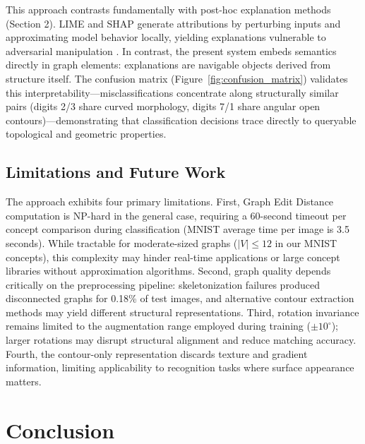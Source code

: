 \documentclass[runningheads]{llncs}
\begin{document}
This approach contrasts fundamentally with post-hoc explanation methods (Section 2). LIME and SHAP generate attributions by perturbing inputs and approximating model behavior locally, yielding explanations vulnerable to adversarial manipulation \cite{slack2020foolinglimeshapadversarial}. In contrast, the present system embeds semantics directly in graph elements: explanations are navigable objects derived from structure itself. The confusion matrix (Figure~\ref{fig:confusion_matrix}) validates this interpretability---misclassifications concentrate along structurally similar pairs (digits 2/3 share curved morphology, digits 7/1 share angular open contours)---demonstrating that classification decisions trace directly to queryable topological and geometric properties.

\subsection{Limitations and Future Work}

The approach exhibits four primary limitations. First, Graph Edit Distance computation is NP-hard in the general case, requiring a 60-second timeout per concept comparison during classification (MNIST average time per image is 3.5 seconds). While tractable for moderate-sized graphs ($|V| \leq 12$ in our MNIST concepts), this complexity may hinder real-time applications or large concept libraries without approximation algorithms. Second, graph quality depends critically on the preprocessing pipeline: skeletonization failures produced disconnected graphs for 0.18\% of test images, and alternative contour extraction methods may yield different structural representations. Third, rotation invariance remains limited to the augmentation range employed during training ($\pm 10^\circ$); larger rotations may disrupt structural alignment and reduce matching accuracy. Fourth, the contour-only representation discards texture and gradient information, limiting applicability to recognition tasks where surface appearance matters.

\section{Conclusion}
\end{document}
